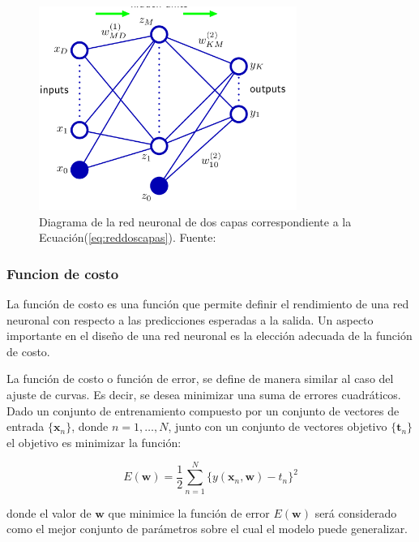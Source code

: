         \begin{figure}[!h] 
            \centering
            \includegraphics[width=0.75\textwidth]{img/reddoscapas}
            \caption{Diagrama de la red neuronal de dos capas correspondiente a la Ecuación(\ref{eq:reddoscapas}). Fuente: \cite{Bishop2006} }
            \label{fig:reddoscapas}
        \end{figure}
        
        \subsubsection{Funcion de costo}
        La función de costo es una función que permite definir el rendimiento de una red neuronal con respecto a las 
        predicciones esperadas a la salida. Un aspecto importante en el diseño de una red neuronal es la elección adecuada 
        de la función de costo. 

        La función de costo o función de error, se define de manera similar al caso del ajuste de curvas. Es decir, se desea 
        minimizar una suma de errores cuadráticos. Dado un conjunto de entrenamiento compuesto por un conjunto de vectores 
        de entrada $\{\mathbf{x}_n \}$, donde $n = 1, \ldots , N$, junto con un conjunto de vectores objetivo $\{\mathbf{t}_n \}$
        el objetivo es minimizar la función:

        \begin{equation}\label{eq:error}
            E(\mathbf{w}) = \frac{1}{2} \sum_{n=1}^N \{y(\mathbf{x}_n, \mathbf{w}) - t_n\}^2
        \end{equation}

        donde el valor de $\mathbf{w}$ que minimice la función de error $E(\mathbf{w})$ será considerado como el mejor conjunto 
        de parámetros sobre el cual el modelo puede generalizar.


